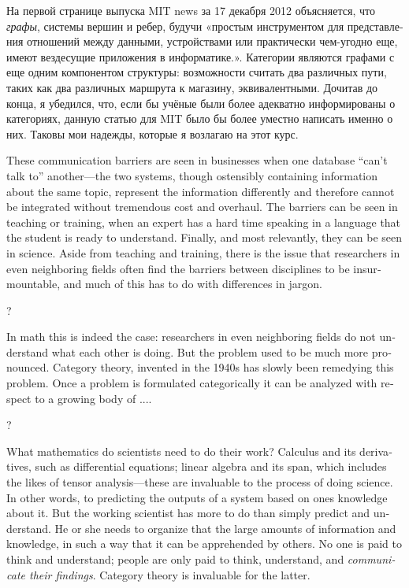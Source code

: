 \documentclass{book}
\theoremstyle{theoremENG}
\theoremstyle{lemmaENG}
\theoremstyle{propositionENG}
\theoremstyle{corollaryENG}
\theoremstyle{factENG}
\theoremstyle{remarkENG}
\theoremstyle{exampleENG}
\theoremstyle{warningENG}
\theoremstyle{questionENG}
\theoremstyle{guessENG}
\theoremstyle{answerENG}
\theoremstyle{constructionENG}
\theoremstyle{rulesENG}
\theoremstyle{excENG}
\theoremstyle{appENG}
\theoremstyle{definitionENG}
\theoremstyle{notationENG}
\theoremstyle{conjectureENG}
\theoremstyle{postulateENG}
\theoremstyle{theoremRUS}
\theoremstyle{lemmaRUS}
\theoremstyle{propositionRUS}
\theoremstyle{corollaryRUS}
\theoremstyle{factRUS}
\theoremstyle{remarkRUS}
\theoremstyle{exampleRUS}
\theoremstyle{warningRUS}
\theoremstyle{questionRUS}
\theoremstyle{guessRUS}
\theoremstyle{answerRUS}
\theoremstyle{constructionRUS}
\theoremstyle{rulesRUS}
\theoremstyle{excRUS}
\theoremstyle{appRUS}
\theoremstyle{definitionRUS}
\theoremstyle{notationRUS}
\theoremstyle{conjectureRUS}
\theoremstyle{postulateRUS}
\begin{document}
\begin{english}
\begin{russian}На первой странице выпуска MIT news за 17 декабря 2012 объясняется, что {\em графы}, системы вершин и ребер, будучи «простым инструментом для представления отношений между данными, устройствами или практически чем-угодно еще, имеют вездесущие приложения в информатике.»\cite{http://web.mit.edu/newsoffice/2012/explained-graphs-computer-science-1217.html}. Категории являются графами с еще одним компонентом структуры: возможности считать два различных пути, таких как два различных маршрута к магазину, эквивалентными. Дочитав до конца, я убедился, что, если бы учёные были более адекватно информированы о категориях, данную статью для MIT было бы более уместно написать именно о них. Таковы мои надежды, которые я возлагаю на этот курс. \end{russian}

These communication barriers are seen in businesses when one database “can't talk to” another---the two systems, though ostensibly containing information about the same topic, represent the information differently and therefore cannot be integrated without tremendous cost and overhaul. The barriers can be seen in teaching or training, when an expert has a hard time speaking in a language that the student is ready to understand. Finally, and most relevantly, they can be seen in science. Aside from teaching and training, there is the issue that researchers in even neighboring fields often find the barriers between disciplines to be insurmountable, and much of this has to do with differences in jargon.

\begin{russian}? \end{russian}

In math this is indeed the case: researchers in even neighboring fields do not understand what each other is doing. But the problem used to be much more pronounced. Category theory, invented in the 1940s has slowly been remedying this problem. Once a problem is formulated categorically it can be analyzed with respect to a growing body of ....

\begin{russian}? \end{russian}

What mathematics do scientists need to do their work? Calculus and its derivatives, such as differential equations; linear algebra and its span, which includes the likes of tensor analysis---these are invaluable to the process of doing science. In other words, to predicting the outputs of a system based on ones knowledge about it. But the working scientist has more to do than simply predict and understand. He or she needs to organize that the large amounts of information and knowledge, in such a way that it can be apprehended by others. No one is paid to think and understand; people are only paid to think, understand, and {\em communicate their findings}. Category theory is invaluable for the latter.


\end{english}
\end{document}
